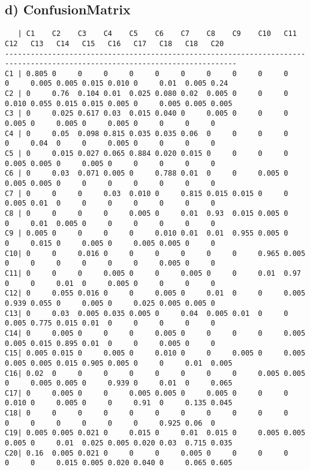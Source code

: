 \documentclass[12pt, a4paper, fleqn]{scrartcl}
\begin{document}
\subsection*{d) ConfusionMatrix}
\begin{lstlisting}
   | C1    C2    C3    C4    C5    C6    C7    C8    C9    C10   C11   C12   C13   C14   C15   C16   C17   C18   C18   C20
----------------------------------------------------------------------------------------------------------------------------
C1 | 0.805 0     0     0     0     0     0     0     0     0     0     0     0.005 0.005 0.015 0.010 0     0.01  0.005 0.24  
C2 | 0     0.76  0.104 0.01  0.025 0.080 0.02  0.005 0     0     0     0.010 0.055 0.015 0.015 0.005 0     0.005 0.005 0.005 
C3 | 0     0.025 0.617 0.03  0.015 0.040 0     0.005 0     0     0     0.005 0     0.005 0     0.005 0     0     0     0     
C4 | 0     0.05  0.098 0.815 0.035 0.035 0.06  0     0     0     0     0     0.04  0     0     0.005 0     0     0     0     
C5 | 0     0.015 0.027 0.065 0.884 0.020 0.015 0     0     0     0     0.005 0.005 0     0.005 0     0     0     0     0     
C6 | 0     0.03  0.071 0.005 0     0.788 0.01  0     0     0.005 0     0.005 0.005 0     0     0     0     0     0     0     
C7 | 0     0     0     0.03  0.010 0     0.815 0.015 0.015 0     0     0.005 0.01  0     0     0     0     0     0     0     
C8 | 0     0     0     0     0.005 0     0.01  0.93  0.015 0.005 0     0     0.01  0.005 0     0     0     0     0     0     
C9 | 0.005 0     0     0     0     0.010 0.01  0.01  0.955 0.005 0     0     0.015 0     0.005 0     0.005 0.005 0     0     
C10| 0     0     0.016 0     0     0     0     0     0     0.965 0.005 0     0     0     0     0     0     0.005 0     0     
C11| 0     0     0     0.005 0     0     0.005 0     0     0.01  0.97  0     0     0.01  0     0.005 0     0     0     0     
C12| 0     0.055 0.016 0     0     0.005 0     0.01  0     0     0.005 0.939 0.055 0     0.005 0     0.025 0.005 0.005 0     
C13| 0     0.03  0.005 0.035 0.005 0     0.04  0.005 0.01  0     0     0.005 0.775 0.015 0.01  0     0     0     0     0     
C14| 0     0.005 0     0     0     0.005 0     0     0     0     0.005 0.005 0.015 0.895 0.01  0     0     0.005 0     0     
C15| 0.005 0.015 0     0.005 0     0.010 0     0     0.005 0     0.005 0.005 0.005 0.015 0.905 0.005 0     0     0.01  0.005 
C16| 0.02  0     0     0     0     0     0     0     0     0.005 0.005 0     0.005 0.005 0     0.939 0     0.01  0     0.065 
C17| 0     0.005 0     0     0.005 0.005 0     0.005 0     0     0     0.010 0     0.005 0     0     0.91  0     0.135 0.045 
C18| 0     0     0     0     0     0     0     0     0     0     0     0     0     0     0     0     0     0.925 0.06  0     
C19| 0.005 0.005 0.021 0     0.015 0     0.01  0.015 0     0.005 0.005 0.005 0     0.01  0.025 0.005 0.020 0.03  0.715 0.035 
C20| 0.16  0.005 0.021 0     0     0     0.005 0     0     0     0     0     0     0.015 0.005 0.020 0.040 0     0.065 0.605 


\end{lstlisting}
\end{document}
